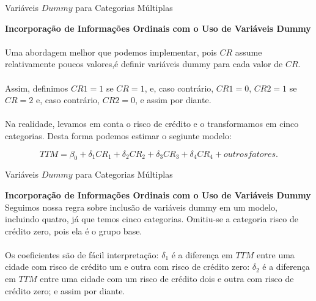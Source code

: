 \documentclass[t,14pt,mathserif]{beamer}
\begin{document}
{
\begin{frame}{Variáveis $Dummy$ para Categorias Múltiplas}
		\begin{tcolorbox}
			\indent\textbf{\small{Incorporação de Informações Ordinais com o Uso de Variáveis Dummy}}\\ 
			\\ \footnotesize{Uma abordagem melhor que podemos implementar, pois $CR$ assume relativamente poucos valores,é definir variáveis dummy para cada valor de $CR$.}\\	
			\\ \footnotesize{Assim, definimos $CR1 = 1$ se $CR = 1$, e, caso contrário, $CR 1 = 0$, $CR2 = 1$ se $CR = 2$ e, caso contrário, $CR2 = 0$, e assim por diante.}\\
			\\ \footnotesize{ Na realidade, levamos em conta o risco de crédito e o transformamos em cinco categorias. Desta forma podemos estimar o segiunte modelo:}
			
			\begin{equation}
			TTM = \beta_{0} + \delta_{1}CR_1 + \delta_{2}CR_2 + \delta_{3}CR_3 + \delta_{4}CR_4 + outros fatores.\label{eq1}\nonumber
			\end{equation}
		 
			
		\end{tcolorbox}
       
\end{frame}
}

{
\begin{frame}{Variáveis $Dummy$ para Categorias Múltiplas}
		\begin{tcolorbox}
			\indent\textbf{\small{Incorporação de Informações Ordinais com o Uso de Variáveis Dummy}}\\ 
			
		   \footnotesize{Seguimos nossa regra sobre inclusão de variáveis dummy em um modelo, incluindo quatro, já que temos cinco categorias. Omitiu-se a categoria risco de crédito zero, pois ela é o grupo base.} \\
		   \\ \footnotesize{Os coeficientes são de fácil interpretação: $\delta_{1}$ é a diferença em $TTM$ entre uma cidade com risco de crédito um e outra com risco de crédito zero: $\delta_{2}$ é a diferença em $TTM$ entre uma cidade com um risco de crédito dois e outra com risco de crédito zero; e assim por diante.}
			
		\end{tcolorbox}
       
\end{frame}
} 
\end{document}

